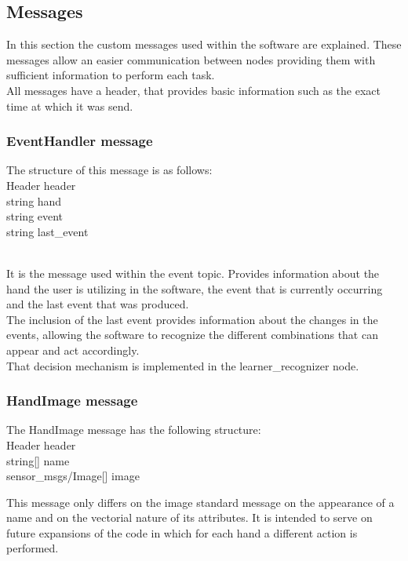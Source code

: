\subsection{Messages}
\label{messages}

In this section the custom messages used within the software are explained. These messages allow an easier communication between nodes providing them with sufficient information to perform each task. 
\\

All messages have a header, that provides basic information such as the exact time at which it was send. 


\subsubsection{EventHandler message}
The structure of this message is as follows: \\

Header header\\
string hand\\
string event\\
string last\_event

\\

It is the message used within the event topic. Provides information about the hand the user is utilizing in the software, the event that is currently occurring and the last event that was produced. 
\\

The inclusion of the last event provides information about the changes in the events, allowing the software to recognize the different combinations that can appear and act accordingly. 
\\

That decision mechanism is implemented in the learner\_recognizer node. 

\subsubsection{HandImage message}

The HandImage message has the following structure: \\
Header header\\
string[] name\\
sensor\_msgs/Image[] image

This message only differs on the image standard message on the appearance of a name and on the vectorial nature of its attributes. It is intended to serve on future expansions of the code in which for each hand a different action is performed. 

